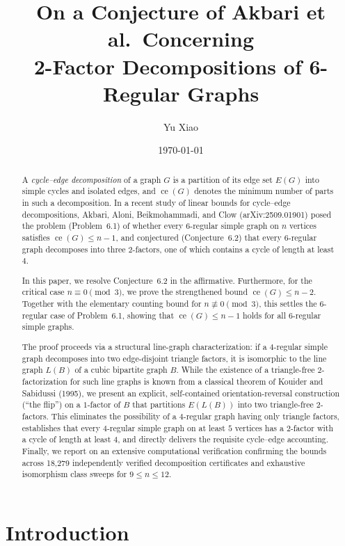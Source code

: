 \documentclass[11pt,reqno]{amsart}
\title[2-Factor Decompositions of 6-Regular Graphs]{On a Conjecture of Akbari et al.\ Concerning\\ 2-Factor Decompositions of 6-Regular Graphs}
\author{Yu Xiao}
\date{\today}
\theoremstyle{definition}
\theoremstyle{remark}
\DeclareMathOperator{\ce}{ce}
\begin{document}
\begin{abstract}
A \emph{cycle--edge decomposition} of a graph $G$ is a partition of its edge set $E(G)$ into simple cycles and isolated edges, and $\ce(G)$ denotes the minimum number of parts in such a decomposition. In a recent study of linear bounds for cycle--edge decompositions, Akbari, Aloni, Beikmohammadi, and Clow (arXiv:2509.01901) posed the problem (Problem~6.1) of whether every $6$-regular simple graph on $n$ vertices satisfies $\ce(G) \le n-1$, and conjectured (Conjecture~6.2) that every $6$-regular graph decomposes into three $2$-factors, one of which contains a cycle of length at least $4$.

In this paper, we resolve Conjecture~6.2 in the affirmative. Furthermore, for the critical case $n \equiv 0 \pmod 3$, we prove the strengthened bound $\ce(G) \le n-2$. Together with the elementary counting bound for $n \not\equiv 0 \pmod 3$, this settles the $6$-regular case of Problem~6.1, showing that $\ce(G) \le n-1$ holds for all $6$-regular simple graphs.

The proof proceeds via a structural line-graph characterization: if a $4$-regular simple graph decomposes into two edge-disjoint triangle factors, it is isomorphic to the line graph $L(B)$ of a cubic bipartite graph $B$. While the existence of a triangle-free $2$-factorization for such line graphs is known from a classical theorem of Kouider and Sabidussi (1995), we present an explicit, self-contained orientation-reversal construction (``the flip'') on a $1$-factor of $B$ that partitions $E(L(B))$ into two triangle-free $2$-factors. This eliminates the possibility of a $4$-regular graph having only triangle factors, establishes that every $4$-regular simple graph on at least $5$ vertices has a $2$-factor with a cycle of length at least $4$, and directly delivers the requisite cycle--edge accounting. Finally, we report on an extensive computational verification confirming the bounds across 18,279 independently verified decomposition certificates and exhaustive isomorphism class sweeps for $9 \le n \le 12$.
\end{abstract}

\maketitle

\section{Introduction}\label{sec:intro}
\end{document}
